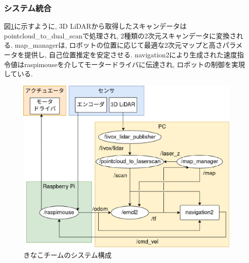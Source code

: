 \subsubsection{システム統合}
図\ref{fig:kinako_system}に示すように, 3D LiDARから取得したスキャンデータはpointcloud\_to\_dual\_scanで処理され, 2種類の2次元スキャンデータに変換される. 
map\_managerは, ロボットの位置に応じて最適な2次元マップと高さパラメータを提供し, 自己位置推定を安定させる. 
navigation2により生成された速度指令値はraspimouseを介してモータードライバに伝達され, ロボットの制御を実現している. 

\begin{figure}[h]
  \begin{center}
    \includegraphics[width=1.0\linewidth]{figs/kinako_system_2024.eps}
    \caption{きなこチームのシステム構成}
    \label{fig:kinako_system}
  \end{center}
\end{figure}
